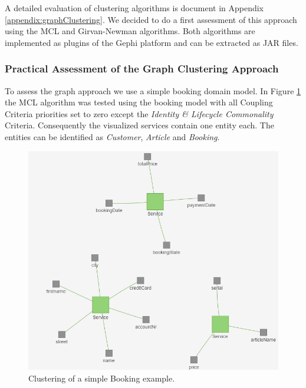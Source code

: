 A detailed evaluation of clustering algorithms is document in Appendix \ref{appendix:graphClustering}. We decided to do a first assessment of this approach using the \gls{MCL}\cite{markovCluster} and Girvan-Newman\cite{girvan} algorithms. Both algorithms are implemented as plugins of the Gephi\cite{gephi} platform and can be extracted as \gls{JAR} files.

\subsubsection{Practical Assessment of the Graph Clustering Approach}

To assess the graph approach we use a simple booking domain model. In Figure \ref{fig:clusteringBookingSimple} the MCL algorithm was tested using the booking model with all Coupling Criteria priorities set to zero except the \textit{Identity \& Lifecycle Commonality} Criteria. Consequently the visualized services contain one entity each. The entities can be identified as \textit{Customer}, \textit{Article} and \textit{Booking}.

\begin{figure}[H]
	\begin{center}
		\includegraphics[scale=0.8]{images/booking_entities.png}
	\end{center}
	\caption{Clustering of a simple Booking example.}
	\label{fig:clusteringBookingSimple}
\end{figure}


